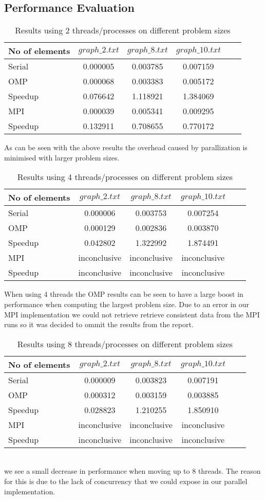 \subsection{Performance Evaluation}
\begin{table}[htb]
	\centering
	\caption{Results using 2 threads/processes on different problem sizes}
	\begin{tabular}{l|ccccc}
		\toprule
		No of elements& $graph\_2.txt$ & $graph\_8.txt$ & $graph\_10.txt$\\
		\midrule
		Serial 	&0.000005	&0.003785&0.007159\\
		OMP 	&0.000068	&0.003383&0.005172\\
		Speedup &0.076642	&1.118921&1.384069\\
		MPI 	&0.000039	&0.005341&0.009295\\
		Speedup &0.132911	&0.708655&0.770172\\
		\bottomrule
	\end{tabular}
\end{table}
As can be seen with the above results the overhead caused by parallization is minimised with larger problem sizes.  
\begin{table}[htb]
	\centering
	\caption{Results using 4 threads/processes on different problem sizes}
	\begin{tabular}{l|ccccc}
		\toprule
		No of elements& $graph\_2.txt$ & $graph\_8.txt$ & $graph\_10.txt$\\
		\midrule
		Serial 	&0.000006		&0.003753&0.007254\\
		OMP 	&0.000129		&0.002836&0.003870\\
		Speedup &0.042802		&1.322992&1.874491\\
		MPI 	&inconclusive	&inconclusive&inconclusive\\
		Speedup &inconclusive	&inconclusive&inconclusive\\
		\bottomrule
	\end{tabular}
\end{table}
\pagebreak
When using 4 threads the OMP results can be seen to have a large boost in performance when computing the largest problem size. Due to an error in our MPI implementation we could not retrieve retrieve consistent data from the MPI runs so it was decided to ommit the results from the report.
\begin{table}[htb]
	\centering
	\caption{Results using 8 threads/processes on different problem sizes}
	\begin{tabular}{l|ccccc}
		\toprule
		No of elements& $graph\_2.txt$ & $graph\_8.txt$ & $graph\_10.txt$\\
		\midrule
		Serial 	&0.000009		&0.003823&0.007191\\
		OMP 	&0.000312		&0.003159&0.003885\\
		Speedup &0.028823		&1.210255&1.850910\\
		MPI 	&inconclusive	&inconclusive&inconclusive\\
		Speedup &inconclusive	&inconclusive&inconclusive\\
		\bottomrule
	\end{tabular}
\end{table}
\\we see a small decrease in performance when moving up to 8 threads. The reason for this is due to the lack of concurrency that we could expose in our parallel implementation. 
 

